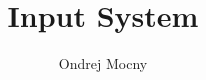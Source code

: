 \documentclass[12pt, a4paper]{article}
\begin{document}
\title{Input System}
\author{Ondrej Mocny}
\maketitle

\tableofcontents

\newpage


\end{document}
